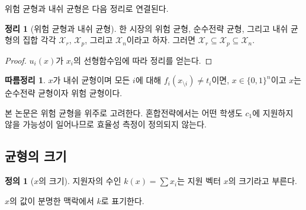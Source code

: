 \documentclass[12pt]{article} %
\newif\ifEN
\newtheorem{theorem}{Theorem}
\newtheorem{corollary}{Corollary}
\theoremstyle{definition}
\newtheorem{definition}{Definition}
\newtheorem{theorem}{정리}
\newtheorem{corollary}{따름정리}
\theoremstyle{definition}
\newtheorem{definition}{정의}
\begin{document}
\ifEN{
Risk equilibria and Nash equilibria are related by the following theorem.
\begin{theorem}[Risk equilibria and Nash equilibria] 
Let $\mathcal{X}_r$, $\mathcal{X}_p$, and $\mathcal{X}_n$ denote the sets of risk, pure-strategy, and Nash equilibria for a given market. Then $\mathcal{X}_r \subseteq \mathcal{X}_p \subseteq \mathcal{X}_n$. 
\end{theorem}
\begin{proof}
The result follows immediately from the fact that $u_i(x)$ is linear in $x_i$. 
\end{proof}
\begin{corollary}
If $x$ is a Nash equilibrium and $f_i(x_{\setminus i}) \neq t_i$ for all $i$, then $x \in \{0, 1\}^n$, and $x$ is also a pure-strategy equilibrium and a risk equilibrium. 
\end{corollary}
This study will concern itself primarily with risk equilibria. In a mixed-strategy equilibrium, there is a chance that zero students apply to $c_1$, which makes some of our efficiency measures undefined. %
} \else {
위험 균형과 내쉬 균형은 다음 정리로 연결된다.
\begin{theorem}[위험 균형과 내쉬 균형] 
한 시장의 위험 균형, 순수전략 균형, 그리고 내쉬 균형의 집합 각각 $\mathcal{X}_r$, $\mathcal{X}_p$, 그리고 $\mathcal{X}_n$이라고 하자. 그러면 $\mathcal{X}_r \subseteq \mathcal{X}_p \subseteq \mathcal{X}_n$.
\end{theorem}
\begin{proof}
$u_i(x)$가 $x_i$의 선형함수임에 따라 정리를 얻는다. 
\end{proof}
\begin{corollary}
$x$가 내쉬 균형이며 모든 $i$에 대해 $f_i(x_{\setminus i}) \neq t_i$이면, $x \in \{0, 1\}^n$이고 $x$는 순수전략 균형이자 위험 균형이다.
\end{corollary}
본 논문은 위험 균형을 위주로 고려한다. 혼합전략에서는 어떤 학생도 $c_1$에 지원하지 않을 가능성이 일어나므로 효율성 측정이 정의되지 않는다.
} \fi


\ifEN \subsection{Size of equilibrium} \else \subsection{균형의 크기} \fi
\ifEN{
\begin{definition}[Size of $x$]
The number of applicants $k(x) = \sum x_i$ is referred to as the \emph{size} of the application vector $x$.
\end{definition}
We will write simply $k$ when the value of $x$ is clear from context.
} \else {
\begin{definition}[$x$의 크기]
지원자의 수인 $k(x) = \sum x_i$는 지원 벡터 $x$의 크기라고 부른다.
\end{definition}
$x$의 값이 분명한 맥락에서 $k$로 표기한다.
} \fi
\end{document}
